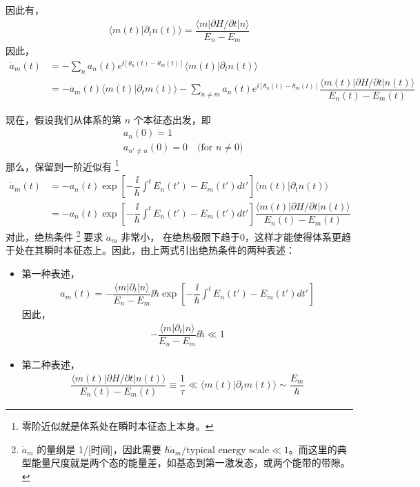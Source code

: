 因此有，
\begin{align}
\langle m(t)|\partial_tn(t)\rangle=\dfrac{\langle m|\partial H/\partial t|n\rangle}{E_n-E_m}
\end{align}
因此，
\begin{align}
\dot{a}_m(t) &=-\sum_na_{n}(t)e^{\ii[\theta_n(t)-\theta_m(t)]}\langle m(t)|\partial_tn(t)\rangle\\
    &= -a_m(t)\langle m(t)|\partial_tm(t)\rangle-\sum_{n\neq m}a_{n}(t)e^{\ii[\theta_n(t)-\theta_m(t)]}\dfrac{\langle m(t)|\partial H/\partial t|n(t)\rangle}{E_n(t)-E_m(t)}
\end{align}

现在，假设我们从体系的第 $n$ 个本征态出发，即
\begin{align}
& a_n(0)=1\\
& a_{n'\neq n}(0)=0 \quad\text{(for $n\neq0$)}
\end{align}
那么，保留到一阶近似有
\footnote{零阶近似就是体系处在瞬时本征态上本身。}
\begin{align}\label{eq:amdot}
\dot{a}_m(t) 
    &= -a_{n}(t)\exp\left[-\dfrac{\ii}{\hbar}\int^tE_n(t')-E_m(t')dt'\right]\langle m(t)|\partial_tn(t)\rangle\\
    &= -a_{n}(t)\exp\left[-\dfrac{\ii}{\hbar}\int^tE_n(t')-E_m(t')dt'\right]\dfrac{\langle m(t)|\partial H/\partial t|n(t)\rangle}{E_n(t)-E_m(t)}
\end{align}
对此，绝热条件
\footnote{$\dot{a}_m$ 的量纲是 1/[时间]，因此需要 $\hbar\dot{a}_m/\text{typical energy scale}\ll1$。而这里的典型能量尺度就是两个态的能量差，如基态到第一激发态，或两个能带的带隙。}
要求 $\dot{a}_m$ 非常小，
在绝热极限下趋于0，这样才能使得体系更趋于处在其瞬时本征态上。因此，由上两式引出绝热条件的两种表述：
\begin{itemize}
\item 第一种表述，\cite{niu2010}
\begin{align}\label{eq:am}
a_m(t)=-\dfrac{\langle m|\partial_t|n\rangle}{E_n-E_m}\ii\hbar\exp\left[-\dfrac{\ii}{\hbar}\int^tE_n(t')-E_m(t')dt'\right]
\end{align}
因此，
\begin{align}
-\dfrac{\langle m|\partial_t|n\rangle}{E_n-E_m}\ii\hbar\ll1
\end{align}
\item 第二种表述，\cite{sakurai}
\begin{align}
\dfrac{\langle m(t)|\partial H/\partial t|n(t)\rangle}{E_n(t)-E_m(t)}\equiv\dfrac{1}{\tau}\ll\langle m(t)|\partial_tm(t)\rangle\sim\dfrac{E_m}{\hbar}
\end{align}
\end{itemize}

